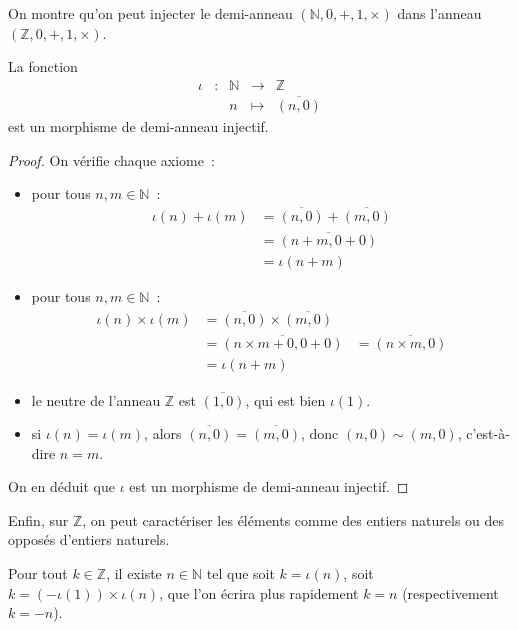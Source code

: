 On montre qu'on peut injecter le demi-anneau $(\mathbb N,0,+,1,\times)$ dans
l'anneau $(\mathbb Z,0,+,1,\times)$.

\begin{proposition}
  La fonction
  \[\begin{array}{ccccc}
  \iota & : & \mathbb N & \longrightarrow & \mathbb Z\\
  & & n & \longmapsto & \overline{(n,0)}
  \end{array}\]
  est un morphisme de demi-anneau injectif.
\end{proposition}

\begin{proof}
  On vérifie chaque axiome~:
  \begin{itemize}
  \item pour tous $n,m\in\mathbb N$~:
    \begin{align*}
      \iota(n) + \iota(m) &= \overline{(n,0)} + \overline{(m,0)}\\
      &= \overline{(n+m,0+0)}\\
      &= \iota(n+m)
    \end{align*}
  \item pour tous $n,m\in\mathbb N$~:
    \begin{align*}
      \iota(n)\times \iota(m) &= \overline{(n,0)} \times \overline{(m,0)}\\
      &= \overline{(n \times m + 0, 0 + 0)}
      &= \overline{(n\times m,0)}\\
      &= \iota(n+m)
    \end{align*}
  \item le neutre de l'anneau $\mathbb Z$ est $\overline{(1,0)}$, qui est bien
    $\iota(1)$.
  \item si $\iota(n) = \iota(m)$, alors $\overline{(n,0)} = \overline{(m,0)}$,
    donc $(n,0)\sim (m,0)$, c'est-à-dire $n = m$.
  \end{itemize}
  On en déduit que $\iota$ est un morphisme de demi-anneau injectif.
\end{proof}

Enfin, sur $\mathbb Z$, on peut caractériser les éléments comme des entiers
naturels ou des opposés d'entiers naturels.

\begin{proposition}
  Pour tout $k \in \mathbb Z$, il existe $n \in \mathbb N$ tel que soit
  $k = \iota(n)$, soit $k = (-\iota(1)) \times \iota(n)$, que l'on écrira
  plus rapidement $k = n$ (respectivement $k = -n$).
\end{proposition}


